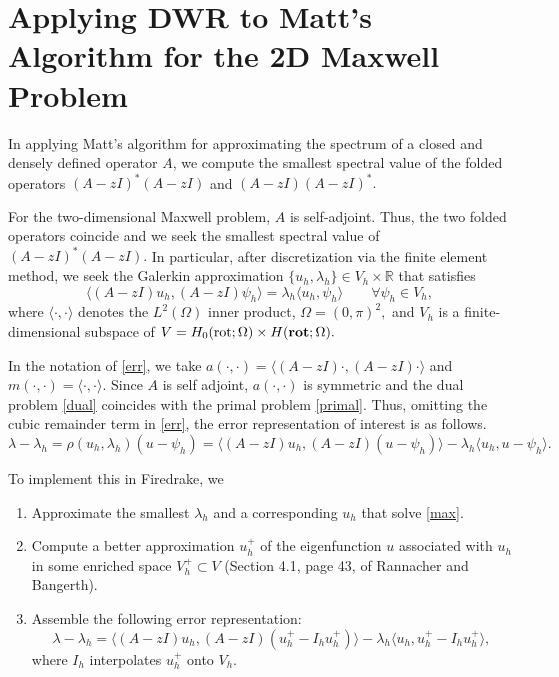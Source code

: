 \documentclass[12pt,a4paper]{article}
\theoremstyle{boldthm}
\theoremstyle{bolddefn}
\begin{document}
\section{Applying DWR to Matt's Algorithm for the 2D Maxwell Problem}


In applying Matt's algorithm for approximating the spectrum of a closed and densely defined operator $A$, we compute the smallest spectral value of the folded operators $(A-zI)^*(A-zI)$ and $(A-zI)(A-zI)^*.$ 

For the two-dimensional Maxwell problem, $A$ is self-adjoint. Thus, the two folded operators coincide and we seek the smallest spectral value of $(A-zI)^*(A-zI).$ In particular, after discretization via the finite element method, we seek the Galerkin approximation $\{u_h, \lambda_h\} \in V_h \times \mathbb{R}$ that satisfies
\begin{equation} \label{max}
    \langle (A-zI) u_h, (A-zI) \psi_h \rangle = \lambda_h \langle u_h, \psi_h \rangle \qquad \forall \psi_h \in V_h,
\end{equation}
where $\langle \cdot, \cdot \rangle$ denotes the $L^2(\Omega)$ inner product, $\Omega = (0, \pi)^2,$ and $V_h$ is a finite-dimensional subspace of $V = H_0(\text{rot}; \Omega) \times H(\text{\textbf{rot}};\Omega).$

In the notation of \eqref{err}, we take $a(\cdot, \cdot) = \langle (A-zI) \cdot, (A-zI) \cdot \rangle$ and $m(\cdot, \cdot) = \langle\cdot, \cdot \rangle.$ Since $A$ is self adjoint, $a(\cdot, \cdot)$ is symmetric and the dual problem \eqref{dual} coincides with the primal problem \eqref{primal}. Thus, omitting the cubic remainder term in \eqref{err}, the error representation of interest is as follows. 
\begin{equation} \label{max err}
    \lambda- \lambda_h = \rho(u_h, \lambda_h)(u - \psi_h) = \langle (A-zI)u_h, (A-zI)(u - \psi_h)\rangle - \lambda_h \langle u_h, u - \psi_h \rangle. 
\end{equation}

To implement this in Firedrake, we 
\begin{enumerate}
    \item Approximate the smallest $\lambda_h$ and a corresponding $u_h$ that solve \eqref{max}.
    \item Compute a better approximation $u_h^+$ of the eigenfunction $u$ associated with $u_h$ in some enriched space $V_h^+ \subset V$ (Section 4.1, page 43, of Rannacher and Bangerth). 
    \item Assemble the following error representation:
    \begin{equation}
        \lambda - \lambda_h = \langle (A-zI)u_h, (A-zI)(u_h^+ - I_h u_h^+)\rangle - \lambda_h \langle u_h, u_h^+ - I_h u_h^+ \rangle, 
    \end{equation}
    where $I_h$ interpolates $u_h^+$ onto $V_h.$
\end{enumerate}
\end{document}
